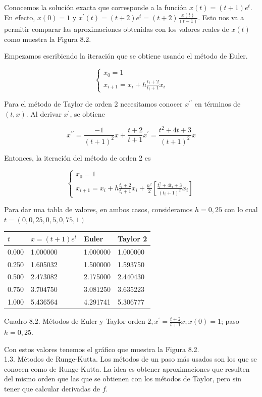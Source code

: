 \documentclass[10pt]{book}
\begin{document}
Conocemos la solución exacta que corresponde a la función $x(t)=(t+1) e^{t}$. En efecto, $x(0)=1$ y $x^{\prime}(t)=(t+2) e^{t}=(t+2) \frac{x(t)}{(t-1)}$. Esto nos va a permitir comparar las aproximaciones obtenidas con los valores reales de $x(t)$ como muestra la Figura 8.2.

Empezamos escribiendo la iteración que se obtiene usando el método de Euler.

$$
\left\{\begin{array}{l}
x_{0}=1 \\
x_{i+1}=x_{i}+h \frac{t_{i}+2}{t_{i}+1} x_{i}
\end{array}\right.
$$

Para el método de Taylor de orden 2 necesitamos conocer $x^{\prime \prime}$ en términos de $(t, x)$. Al derivar $x^{\prime}$, se obtiene

$$
x^{\prime \prime}=\frac{-1}{(t+1)^{2}} x+\frac{t+2}{t+1} x^{\prime}=\frac{t^{2}+4 t+3}{(t+1)^{2}} x
$$

Entonces, la iteración del método de orden 2 es

$$
\left\{\begin{array}{l}
x_{0}=1 \\
x_{i+1}=x_{i}+h \frac{t_{i}+2}{t_{i}+1} x_{i}+\frac{h^{2}}{2}\left[\frac{t_{i}^{2}+4 t_{i}+3}{\left(t_{i}+1\right)^{2}} x_{i}\right]
\end{array}\right.
$$

Para dar una tabla de valores, en ambos casos, consideramos $h=0,25$ con lo cual $t=(0,0,25,0,5,0,75,1)$

\begin{center}
\begin{tabular}{|l|l|l|l|}
\hline
$t$ & $x=(t+1) e^{t}$ & Euler & Taylor 2 \\
\hline
0.000 & 1.000000 & 1.000000 & 1.000000 \\
0.250 & 1.605032 & 1.500000 & 1.593750 \\
0.500 & 2.473082 & 2.175000 & 2.440430 \\
0.750 & 3.704750 & 3.081250 & 3.635223 \\
1.000 & 5.436564 & 4.291741 & 5.306777 \\
\hline
\end{tabular}
\end{center}

Cuadro 8.2. Métodos de Euler y Taylor orden $2, x^{\prime}=\frac{t+2}{t+1} x ; x(0)=1$; paso $h=0,25$.

Con estos valores tenemos el gráfico que muestra la Figura 8.2.\\
1.3. Métodos de Runge-Kutta. Los métodos de un paso más usados son los que se conocen como de Runge-Kutta. La idea es obtener aproximaciones que resulten del mismo orden que las que se obtienen con los métodos de Taylor, pero sin tener que calcular derivadas de $f$.
\end{document}
